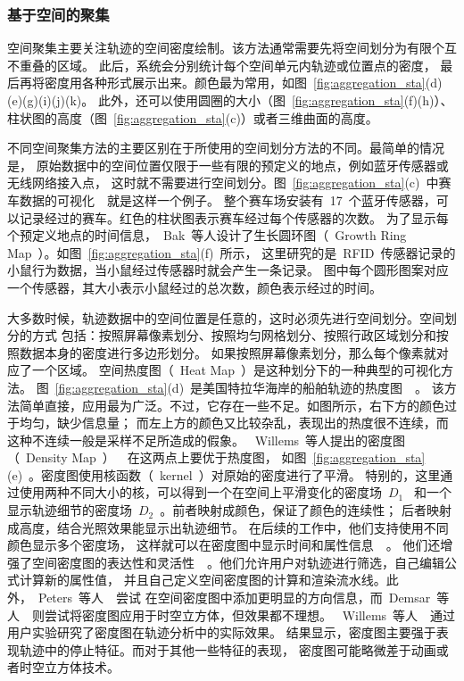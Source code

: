\documentclass[12pt,twocolumn]{article}
\begin{document}
\subsubsection{基于空间的聚集}

空间聚集主要关注轨迹的空间密度绘制。该方法通常需要先将空间划分为有限个互不重叠的区域。
此后，系统会分别统计每个空间单元内轨迹或位置点的密度，
最后再将密度用各种形式展示出来。颜色最为常用，如图~\ref{fig:aggregation_sta}(d)(e)(g)(i)(j)(k)。
此外，还可以使用圆圈的大小（图~\ref{fig:aggregation_sta}(f)(h)）、
柱状图的高度（图~\ref{fig:aggregation_sta}(c)）或者三维曲面的高度。

不同空间聚集方法的主要区别在于所使用的空间划分方法的不同。最简单的情况是，
原始数据中的空间位置仅限于一些有限的预定义的地点，例如蓝牙传感器或无线网络接入点，
这时就不需要进行空间划分。图~\ref{fig:aggregation_sta}(c)~中赛车数据的可视化~\citep{AndrienkoASLH2012}~就是这样一个例子。
整个赛车场安装有~17~个蓝牙传感器，可以记录经过的赛车。红色的柱状图表示赛车经过每个传感器的次数。
为了显示每个预定义地点的时间信息，~Bak~等人设计了生长圆环图（~Growth Ring Map~）。如图~\ref{fig:aggregation_sta}(f)~所示，
这里研究的是~RFID~传感器记录的小鼠行为数据，当小鼠经过传感器时就会产生一条记录。
图中每个圆形图案对应一个传感器，其大小表示小鼠经过的总次数，颜色表示经过的时间。

大多数时候，轨迹数据中的空间位置是任意的，这时必须先进行空间划分。空间划分的方式
包括：按照屏幕像素划分、按照均匀网格划分、按照行政区域划分和按照数据本身的密度进行多边形划分。
如果按照屏幕像素划分，那么每个像素就对应了一个区域。
空间热度图（~Heat Map~）是这种划分下的一种典型的可视化方法。
图~\ref{fig:aggregation_sta}(d)~是美国特拉华海岸的船舶轨迹的热度图~\citep{DelawareVesselHeatMap}~。
该方法简单直接，应用最为广泛。不过，它存在一些不足。如图所示，右下方的颜色过于均匀，缺少信息量；
而左上方的颜色又比较杂乱，表现出的热度很不连续，而这种不连续一般是采样不足所造成的假象。
~Willems~等人提出的密度图（~Density Map~）~\citep{WillemsWW2009}~在这两点上要优于热度图，
如图~\ref{fig:aggregation_sta}(e)~。密度图使用核函数（~kernel~）对原始的密度进行了平滑。
特别的，这里通过使用两种不同大小的核，可以得到一个在空间上平滑变化的密度场~$D_1$~
和一个显示轨迹细节的密度场~$D_2$~。前者映射成颜色，保证了颜色的连续性；
后者映射成高度，结合光照效果能显示出轨迹细节。
在后续的工作中，他们支持使用不同颜色显示多个密度场，
这样就可以在密度图中显示时间和属性信息~\citep{ScheepensWWW2011}~。
他们还增强了空间密度图的表达性和灵活性~\citep{ScheepensWWAAW2011}~。他们允许用户对轨迹进行筛选，自己编辑公式计算新的属性值，
并且自己定义空间密度图的计算和渲染流水线。此外，~Peters~等人~\citep{PetersK2010}~尝试
在空间密度图中添加更明显的方向信息，而~Demsar~等人~\citep{DemsarV2010}~则尝试将密度图应用于时空立方体，但效果都不理想。
~Willems~等人~\citep{WillemsWW2011}~通过用户实验研究了密度图在轨迹分析中的实际效果。
结果显示，密度图主要强于表现轨迹中的停止特征。而对于其他一些特征的表现，
密度图可能略微差于动画或者时空立方体技术。
\end{document}

